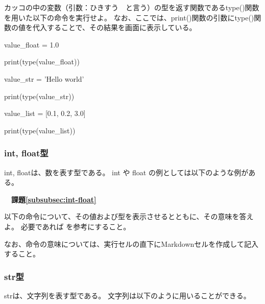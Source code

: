 \noindent
カッコの中の変数（引数：ひきすう　と言う）の型を返す関数である{\ttfamily type()}関数を用いた以下の命令を実行せよ。
なお、ここでは、{\ttfamily print()}関数の引数に{\ttfamily type()}関数の値を代入することで、その結果を画面に表示している。


\begin{itemize}
	{\ttfamily 
		\item value\_float = 1.0

		print(type(value\_float))

		\item value\_str = 'Hello world'

		print(type(value\_str))
		
		\item value\_list = [0.1, 0.2, 3.0]
		
		print(type(value\_list))
	}
\end{itemize}


\subsubsection{int, float型\label{subsubsec:int-float}}
{\ttfamily int, float}は、数を表す型である。
int や float の例としては以下のような例がある。


{\bfseries　課題\ref{subsubsec:int-float}}

\noindent
以下の命令について、その値および型を表示させるとともに、その意味を答えよ。
必要であれば
を参考にすること。

なお、命令の意味については、実行セルの直下にMarkdownセルを作成して記入すること。
\begin{comment}
\begin{enumerate}
	{\ttfamily 
		\item a = 2.0\\
			  b = 3.0 ** 2.0\\
		
		\item a = 5 \% 2\\
		
		\item a = 3 * 2.0 + 1.0\\
	}
\end{enumerate}
content...
\end{comment}


\subsubsection{str型\label{subsubsec:str}}
{\ttfamily str}は、文字列を表す型である。
文字列は以下のように用いることができる。

